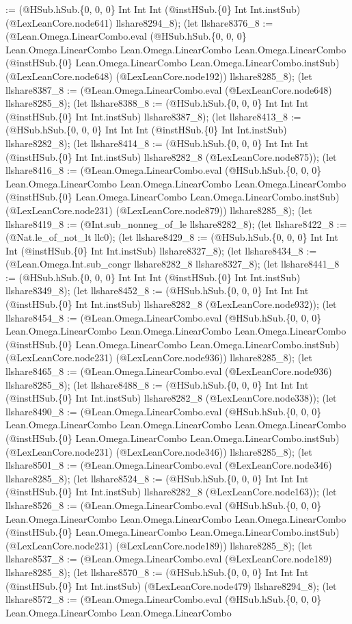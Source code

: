 \documentclass[11pt]{article}
\begin{document}
:= (@HSub.hSub.\{0, 0, 0\} Int Int Int (@instHSub.\{0\} Int Int.instSub) (@LexLeanCore.node641) llshare8294\_8); (let llshare8376\_8 := (@Lean.Omega.LinearCombo.eval (@HSub.hSub.\{0, 0, 0\} Lean.Omega.LinearCombo Lean.Omega.LinearCombo Lean.Omega.LinearCombo (@instHSub.\{0\} Lean.Omega.LinearCombo Lean.Omega.LinearCombo.instSub) (@LexLeanCore.node648) (@LexLeanCore.node192)) llshare8285\_8); (let llshare8387\_8 := (@Lean.Omega.LinearCombo.eval (@LexLeanCore.node648) llshare8285\_8); (let llshare8388\_8 := (@HSub.hSub.\{0, 0, 0\} Int Int Int (@instHSub.\{0\} Int Int.instSub) llshare8387\_8); (let llshare8413\_8 := (@HSub.hSub.\{0, 0, 0\} Int Int Int (@instHSub.\{0\} Int Int.instSub) llshare8282\_8); (let llshare8414\_8 := (@HSub.hSub.\{0, 0, 0\} Int Int Int (@instHSub.\{0\} Int Int.instSub) llshare8282\_8 (@LexLeanCore.node875)); (let llshare8416\_8 := (@Lean.Omega.LinearCombo.eval (@HSub.hSub.\{0, 0, 0\} Lean.Omega.LinearCombo Lean.Omega.LinearCombo Lean.Omega.LinearCombo (@instHSub.\{0\} Lean.Omega.LinearCombo Lean.Omega.LinearCombo.instSub) (@LexLeanCore.node231) (@LexLeanCore.node879)) llshare8285\_8); (let llshare8419\_8 := (@Int.sub\_nonneg\_of\_le llshare8282\_8); (let llshare8422\_8 := (@Nat.le\_of\_not\_lt llc0); (let llshare8429\_8 := (@HSub.hSub.\{0, 0, 0\} Int Int Int (@instHSub.\{0\} Int Int.instSub) llshare8327\_8); (let llshare8434\_8 := (@Lean.Omega.Int.sub\_congr llshare8282\_8 llshare8327\_8); (let llshare8441\_8 := (@HSub.hSub.\{0, 0, 0\} Int Int Int (@instHSub.\{0\} Int Int.instSub) llshare8349\_8); (let llshare8452\_8 := (@HSub.hSub.\{0, 0, 0\} Int Int Int (@instHSub.\{0\} Int Int.instSub) llshare8282\_8 (@LexLeanCore.node932)); (let llshare8454\_8 := (@Lean.Omega.LinearCombo.eval (@HSub.hSub.\{0, 0, 0\} Lean.Omega.LinearCombo Lean.Omega.LinearCombo Lean.Omega.LinearCombo (@instHSub.\{0\} Lean.Omega.LinearCombo Lean.Omega.LinearCombo.instSub) (@LexLeanCore.node231) (@LexLeanCore.node936)) llshare8285\_8); (let llshare8465\_8 := (@Lean.Omega.LinearCombo.eval (@LexLeanCore.node936) llshare8285\_8); (let llshare8488\_8 := (@HSub.hSub.\{0, 0, 0\} Int Int Int (@instHSub.\{0\} Int Int.instSub) llshare8282\_8 (@LexLeanCore.node338)); (let llshare8490\_8 := (@Lean.Omega.LinearCombo.eval (@HSub.hSub.\{0, 0, 0\} Lean.Omega.LinearCombo Lean.Omega.LinearCombo Lean.Omega.LinearCombo (@instHSub.\{0\} Lean.Omega.LinearCombo Lean.Omega.LinearCombo.instSub) (@LexLeanCore.node231) (@LexLeanCore.node346)) llshare8285\_8); (let llshare8501\_8 := (@Lean.Omega.LinearCombo.eval (@LexLeanCore.node346) llshare8285\_8); (let llshare8524\_8 := (@HSub.hSub.\{0, 0, 0\} Int Int Int (@instHSub.\{0\} Int Int.instSub) llshare8282\_8 (@LexLeanCore.node163)); (let llshare8526\_8 := (@Lean.Omega.LinearCombo.eval (@HSub.hSub.\{0, 0, 0\} Lean.Omega.LinearCombo Lean.Omega.LinearCombo Lean.Omega.LinearCombo (@instHSub.\{0\} Lean.Omega.LinearCombo Lean.Omega.LinearCombo.instSub) (@LexLeanCore.node231) (@LexLeanCore.node189)) llshare8285\_8); (let llshare8537\_8 := (@Lean.Omega.LinearCombo.eval (@LexLeanCore.node189) llshare8285\_8); (let llshare8570\_8 := (@HSub.hSub.\{0, 0, 0\} Int Int Int (@instHSub.\{0\} Int Int.instSub) (@LexLeanCore.node479) llshare8294\_8); (let llshare8572\_8 := (@Lean.Omega.LinearCombo.eval (@HSub.hSub.\{0, 0, 0\} Lean.Omega.LinearCombo Lean.Omega.LinearCombo 
\end{document}
